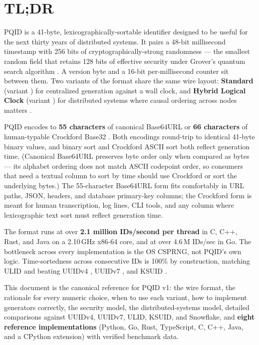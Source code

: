 \section*{TL;DR}

\textsf{PQID} is a 41-byte, lexicographically-sortable identifier designed to be useful for the next thirty years of distributed systems. It pairs a 48-bit millisecond timestamp with 256 bits of cryptographically-strong randomness --- the smallest random field that retains 128 bits of effective security under Grover's quantum search algorithm \citep{grover1996}. A version byte and a 16-bit per-millisecond counter sit between them. Two variants of the format share the same wire layout: \textbf{Standard} (variant ) for centralized generation against a wall clock, and \textbf{Hybrid Logical Clock} (variant ) for distributed systems where causal ordering across nodes matters \citep{kulkarni2014hlc}.

PQID encodes to \textbf{55 characters} of canonical Base64URL \citep{rfc4648} or \textbf{66 characters} of human-typable Crockford Base32 \citep{crockford}. Both encodings round-trip to identical 41-byte binary values, and binary sort and Crockford ASCII sort both reflect generation time. (Canonical Base64URL preserves byte order only when compared as bytes --- its alphabet ordering does not match ASCII codepoint order, so consumers that need a textual column to sort by time should use Crockford or sort the underlying bytes.) The 55-character Base64URL form fits comfortably in URL paths, JSON, headers, and database primary-key columns; the Crockford form is meant for human transcription, log lines, CLI tools, and any column where lexicographic text sort must reflect generation time.

The format runs at over \textbf{2.1 million IDs/second per thread} in C, C++, Rust, and Java on a 2.10\,GHz x86-64 core, and at over 4.6\,M IDs/sec in Go. The bottleneck across every implementation is the OS CSPRNG, not PQID's own logic. Time-sortedness across consecutive IDs is 100\% by construction, matching ULID \citep{ulid} and beating UUIDv4 \citep{rfc4122}, UUIDv7 \citep{rfc9562}, and KSUID \citep{ksuid}.

This document is the canonical reference for PQID v1: the wire format, the rationale for every numeric choice, when to use each variant, how to implement generators correctly, the security model, the distributed-systems model, detailed comparisons against UUIDv4, UUIDv7, ULID, KSUID, and Snowflake, and \textbf{eight reference implementations} (Python, Go, Rust, TypeScript, C, C++, Java, and a CPython extension) with verified benchmark data.

